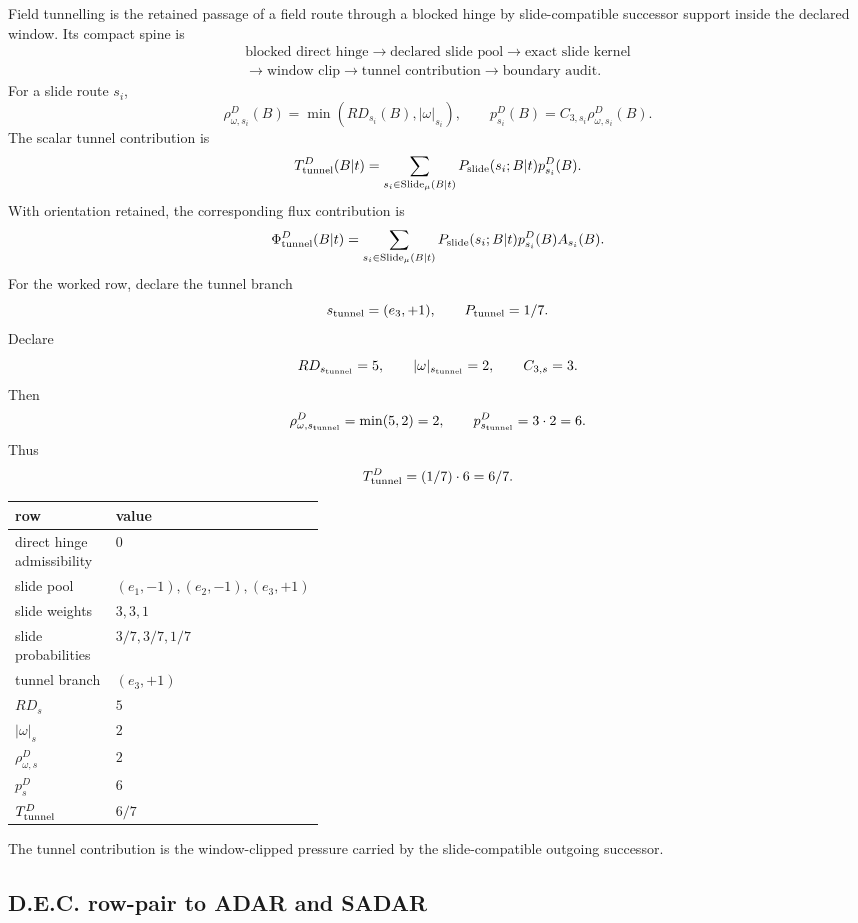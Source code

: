 Field tunnelling is the retained passage of a field route through a blocked hinge by slide-compatible successor support inside the declared window. Its compact spine is
\[
\begin{array}{c}
\text{blocked direct hinge}\to\text{declared slide pool}\to\text{exact slide kernel}\\[0.25em]
\to\text{window clip}\to\text{tunnel contribution}\to\text{boundary audit}.
\end{array}
\]
For a slide route $s_i$,
\[
\rho^D_{\omega,s_i}(B)=\min(RD_{s_i}(B),|\omega|_{s_i}),
\qquad
p^D_{s_i}(B)=C_{3,s_i}\rho^D_{\omega,s_i}(B).
\]
The scalar tunnel contribution is
\[
T^D_{\rm tunnel}(B|t)=\sum_{s_i\in\operatorname{Slide}_{\mu}(B|t)}P_{\rm slide}(s_i;B|t)p^D_{s_i}(B).
\]
With orientation retained, the corresponding flux contribution is
\[
\Phi^D_{\rm tunnel}(B|t)=\sum_{s_i\in\operatorname{Slide}_{\mu}(B|t)}P_{\rm slide}(s_i;B|t)p^D_{s_i}(B)A_{s_i}(B).
\]
For the worked row, declare the tunnel branch
\[
s_{\rm tunnel}=(e_3,+1),
\qquad
P_{\rm tunnel}=1/7.
\]
Declare
\[
RD_{s_{\rm tunnel}}=5,
\qquad
|\omega|_{s_{\rm tunnel}}=2,
\qquad
C_{3,s}=3.
\]
Then
\[
\rho^D_{\omega,s_{\rm tunnel}}=\min(5,2)=2,
\qquad
p^D_{s_{\rm tunnel}}=3\cdot 2=6.
\]
Thus
\[
T^D_{\rm tunnel}=(1/7)\cdot 6=6/7.
\]
\begin{center}
\scriptsize
\begin{tabularx}{0.96\linewidth}{@{}p{0.36\linewidth}X@{}}
\toprule
row & value \\
\midrule
direct hinge admissibility & $0$ \\
slide pool & $(e_1,-1),(e_2,-1),(e_3,+1)$ \\
slide weights & $3,3,1$ \\
slide probabilities & $3/7,3/7,1/7$ \\
tunnel branch & $(e_3,+1)$ \\
$RD_s$ & $5$ \\
$|\omega|_s$ & $2$ \\
$\rho^D_{\omega,s}$ & $2$ \\
$p^D_s$ & $6$ \\
$T^D_{\rm tunnel}$ & $6/7$ \\
\bottomrule
\end{tabularx}
\end{center}
The tunnel contribution is the window-clipped pressure carried by the slide-compatible outgoing successor.

\subsection{D.E.C. row-pair to ADAR and SADAR}

